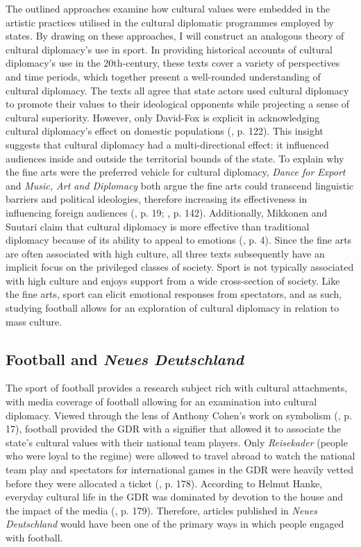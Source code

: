 The outlined approaches examine how cultural values were embedded in the artistic practices utilised in the cultural diplomatic programmes employed by states. By drawing on these approaches, I will construct an analogous theory of cultural diplomacy’s use in sport. In providing historical accounts of cultural diplomacy’s use in the 20th-century, these texts cover a variety of perspectives and time periods, which together present a well-rounded understanding of cultural diplomacy. The texts all agree that state actors used cultural diplomacy to promote their values to their ideological opponents while projecting a sense of cultural superiority. However, only David-Fox is explicit in acknowledging cultural diplomacy’s effect on domestic populations (\citeyear{david-fox2011}, p. 122). This insight suggests that cultural diplomacy had a multi-directional effect: it influenced audiences inside and outside the territorial bounds of the state. To explain why the fine arts were the preferred vehicle for cultural diplomacy, \textit{Dance for Export} and \textit{Music, Art and Diplomacy} both argue the fine arts could transcend linguistic barriers and political ideologies, therefore increasing its effectiveness in influencing foreign audiences (\cite{prevots1998}, p. 19; \cite{gonçalves2016}, p. 142). Additionally, Mikkonen and Suutari claim that cultural diplomacy is more effective than traditional diplomacy because of its ability to appeal to emotions (\citeyear{mikkonensuutari2016}, p. 4). Since the fine arts are often associated with high culture, all three texts subsequently have an implicit focus on the privileged classes of society. Sport is not typically associated with high culture and enjoys support from a wide cross-section of society. Like the fine arts, sport can elicit emotional responses from spectators, and as such, studying football allows for an exploration of cultural diplomacy in relation to mass culture.

\subsection*{Football and \textit{Neues Deutschland}}

The sport of football provides a research subject rich with cultural attachments, with media coverage of football allowing for an examination into cultural diplomacy. Viewed through the lens of Anthony Cohen’s work on symbolism (\cite{cohen1985}, p. 17), football provided the GDR with a signifier that allowed it to associate the state’s cultural values with their national team players. Only \textit{Reisekader} (people who were loyal to the regime) were allowed to travel abroad to watch the national team play and spectators for international games in the GDR were heavily vetted before they were allocated a ticket (\cite{mcdougall2014}, p. 178). According to Helmut Hanke, everyday cultural life in the GDR was dominated by devotion to the house and the impact of the media (\citeyear{hanke1990}, p. 179). Therefore, articles published in \textit{Neues Deutschland} would have been one of the primary ways in which people engaged with football.

